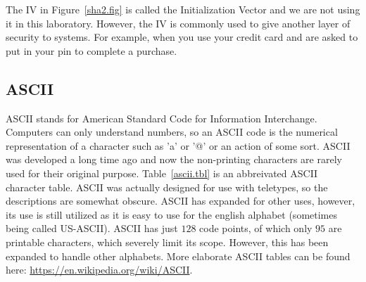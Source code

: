\documentclass{article}
\begin{document}
The IV in Figure~\ref{sha2.fig} is called the Initialization Vector
and we are not using it in this laboratory.  However, the IV is commonly
used to give another layer of security to systems.  For example, when
you use your credit card and are asked to put in your pin to complete a purchase.

\subsection{ASCII}

ASCII stands for American Standard Code for Information
Interchange. Computers can only understand numbers, so an ASCII code
is the numerical representation of a character such as 'a' or '@' or
an action of some sort. ASCII was developed a long time ago and now
the non-printing characters are rarely used for their original
purpose. Table~\ref{ascii.tbl} is an abbreivated
ASCII character table. ASCII was
actually designed for use with teletypes, so the descriptions are
somewhat obscure.
ASCII has expanded for other uses, however, its use is still
utilized as it is easy to use for the english alphabet (sometimes being
called US-ASCII).
ASCII has just $128$ code points, of which only $95$ are printable
characters, which severely limit its scope.  However, this has been
expanded to handle other alphabets.  More elaborate ASCII tables can
be found here: \url{https://en.wikipedia.org/wiki/ASCII}.
\end{document}
